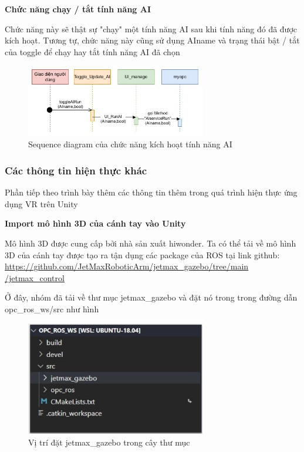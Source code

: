 \textbf{Chức năng chạy / tắt tính năng AI} 

Chức năng này sẽ thật sự "chạy" một tính năng AI sau khi tính năng đó đã được kích hoạt. Tương tự, chức năng này cũng sử dụng AIname và trạng thái bật / tắt của toggle để chạy hay tắt tính năng AI đã chọn

\begin{figure}[H]
    \centering
    \includegraphics[width=0.7\textwidth]{Images/Implementation/VRapp/VR_AIrun.jpg}
    \caption{Sequence diagram của chức năng kích hoạt tính năng AI}
    \label{fig:seq_activateAI}
\end{figure}

\subsubsection{Các thông tin hiện thực khác}

Phần tiếp theo trình bày thêm các thông tin thêm trong quá trình hiện thực ứng dụng VR trên Unity

\textbf{Import mô hình 3D của cánh tay vào Unity} 

Mô hình 3D được cung cấp bởi nhà sản xuất hiwonder. Ta có thể tải về mô hình 3D của cánh tay được tạo ra tận dụng các package của ROS tại link github: \href{https://github.com/JetMaxRoboticArm/jetmax_gazebo/tree/main/jetmax_control}{https://github.com/JetMaxRoboticArm/jetmax\_gazebo/tree/main\\/jetmax\_control}

Ở đây, nhóm đã tải về thư mục jetmax\_gazebo và đặt nó trong trong đường dẫn opc\_ros\_ws/src như hình

\begin{figure}[H]
    \centering
    \includegraphics[width=0.7\textwidth]{Images/Implementation/VRapp/model3d.jpg}
    \caption{Vị trí đặt jetmax\_gazebo trong cây thư mục}
    \label{fig:model3d_0}
\end{figure}

